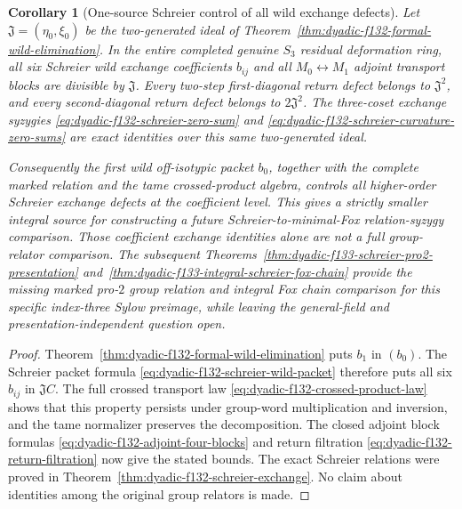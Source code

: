 \documentclass[11pt]{article}
\newtheorem{corollary}[theorem]{Corollary}
\theoremstyle{definition}
\begin{document}
\begin{corollary}[One-source Schreier control of all wild exchange defects]
\label{cor:dyadic-f132-one-source-schreier-control}
Let
$\mathfrak J=
(\eta_0,\xi_0)$ be
the two-generated
ideal of
Theorem~\ref{thm:dyadic-f132-formal-wild-elimination}.
In the entire completed
genuine $S_3$
residual deformation
ring, all six
Schreier wild exchange
coefficients $b_{ij}$
and all
$M_0\leftrightarrow M_1$
adjoint transport
blocks are divisible
by $\mathfrak J$.
Every two-step
first-diagonal return
defect belongs to
$\mathfrak J^2$,
and every
second-diagonal
return defect
belongs to
$2\mathfrak J^2$.
The three-coset
exchange syzygies
\eqref{eq:dyadic-f132-schreier-zero-sum}
and
\eqref{eq:dyadic-f132-schreier-curvature-zero-sums}
are exact identities
over this \emph{same}
two-generated ideal.

Consequently the
first wild
off-isotypic packet
$b_0$, together
with the complete
marked relation
and the tame
crossed-product
algebra, controls
all higher-order
Schreier exchange
defects at the
coefficient level.
This gives a
strictly smaller
integral source
for constructing
a future
Schreier-to-minimal-Fox
relation-syzygy
comparison.
Those coefficient
exchange identities
alone are not
a full group-relator
comparison.  The subsequent
Theorems~\ref{thm:dyadic-f133-schreier-pro2-presentation}
and~\ref{thm:dyadic-f133-integral-schreier-fox-chain}
provide the missing
marked pro-$2$ group
relation and integral
Fox chain comparison
for this specific
index-three Sylow
preimage, while leaving
the general-field and
presentation-independent
question open.
\end{corollary}

\begin{proof}
Theorem~\ref{thm:dyadic-f132-formal-wild-elimination}
puts $b_1$ in
$(b_0)$.
The Schreier
packet formula
\eqref{eq:dyadic-f132-schreier-wild-packet}
therefore puts
all six $b_{ij}$
in $\mathfrak J C$.
The full crossed
transport law
\eqref{eq:dyadic-f132-crossed-product-law}
shows that this
property persists
under group-word
multiplication
and inversion,
and the tame
normalizer
preserves the
decomposition.
The closed adjoint
block formulas
\eqref{eq:dyadic-f132-adjoint-four-blocks}
and return
filtration
\eqref{eq:dyadic-f132-return-filtration}
now give the stated
bounds.
The exact
Schreier relations
were proved in
Theorem~\ref{thm:dyadic-f132-schreier-exchange}.
No claim about
identities among
the original
group relators
is made.
\end{proof}
\end{document}
